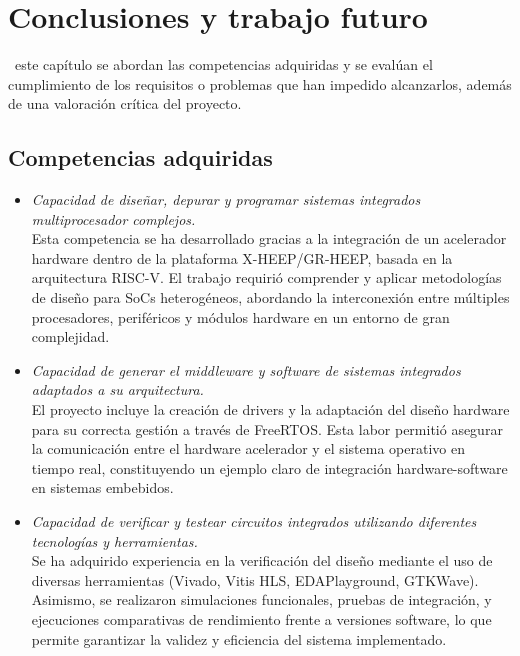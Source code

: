 \chapter{Conclusiones y trabajo futuro}
\label{cap:conclusiones}

\vspace{-30pt}

~este capítulo se abordan las competencias adquiridas y se evalúan el cumplimiento de los requisitos o problemas que han impedido alcanzarlos, además de una valoración crítica del proyecto.

\section{Competencias adquiridas}
\begin{itemize}
    \item \textit{Capacidad de diseñar, depurar y programar sistemas integrados multiprocesador complejos.} \\
    Esta competencia se ha desarrollado gracias a la integración de un acelerador hardware dentro de la plataforma X-HEEP/GR-HEEP, basada en la arquitectura RISC-V. El trabajo requirió comprender y aplicar metodologías de diseño para SoCs heterogéneos, abordando la interconexión entre múltiples procesadores, periféricos y módulos hardware en un entorno de gran complejidad.

    \item \textit{Capacidad de generar el middleware y software de sistemas integrados adaptados a su arquitectura.} \\
    El proyecto incluye la creación de drivers y la adaptación del diseño hardware para su correcta gestión a través de FreeRTOS. Esta labor permitió asegurar la comunicación entre el hardware acelerador y el sistema operativo en tiempo real, constituyendo un ejemplo claro de integración hardware-software en sistemas embebidos.

    \item \textit{Capacidad de verificar y testear circuitos integrados utilizando diferentes tecnologías y herramientas.} \\
    Se ha adquirido experiencia en la verificación del diseño mediante el uso de diversas herramientas (Vivado, Vitis HLS, EDAPlayground, GTKWave). Asimismo, se realizaron simulaciones funcionales, pruebas de integración, y ejecuciones comparativas de rendimiento frente a versiones software, lo que permite garantizar la validez y eficiencia del sistema implementado.
\end{itemize}

